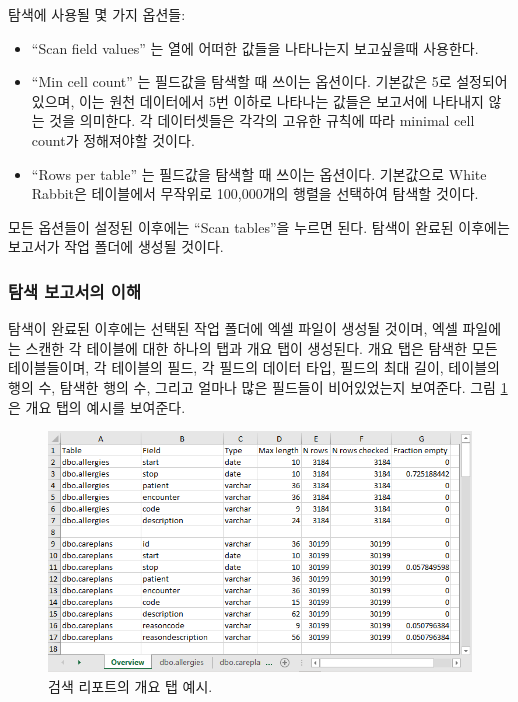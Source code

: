 \documentclass[11pt]{book}
\providecommand{\tightlist}{%
  \setlength{\itemsep}{0pt}\setlength{\parskip}{0pt}}
\theoremstyle{definition}
\theoremstyle{definition}
\theoremstyle{definition}
\theoremstyle{remark}
\begin{document}
탐색에 사용될 몇 가지 옵션들:

\begin{itemize}
\tightlist
\item
  ``Scan field values'' 는 열에 어떠한 값들을 나타나는지 보고싶을때
  사용한다.
\item
  ``Min cell count'' 는 필드값을 탐색할 때 쓰이는 옵션이다. 기본값은 5로
  설정되어 있으며, 이는 원천 데이터에서 5번 이하로 나타나는 값들은
  보고서에 나타내지 않는 것을 의미한다. 각 데이터셋들은 각각의 고유한
  규칙에 따라 minimal cell count가 정해져야할 것이다.
\item
  ``Rows per table'' 는 필드값을 탐색할 때 쓰이는 옵션이다. 기본값으로
  White Rabbit은 테이블에서 무작위로 100,000개의 행렬을 선택하여 탐색할
  것이다.
\end{itemize}

모든 옵션들이 설정된 이후에는 ``Scan tables''을 누르면 된다. 탐색이
완료된 이후에는 보고서가 작업 폴더에 생성될 것이다.

\subsubsection*{탐색 보고서의 이해}\label{--}

탐색이 완료된 이후에는 선택된 작업 폴더에 엑셀 파일이 생성될 것이며,
엑셀 파일에는 스캔한 각 테이블에 대한 하나의 탭과 개요 탭이 생성된다.
개요 탭은 탐색한 모든 테이블들이며, 각 테이블의 필드, 각 필드의 데이터
타입, 필드의 최대 길이, 테이블의 행의 수, 탐색한 행의 수, 그리고 얼마나
많은 필드들이 비어있었는지 보여준다. 그림 \ref{fig:ScanOverviewTab}은
개요 탭의 예시를 보여준다.

\begin{figure}

{\centering \includegraphics[width=1\linewidth]{images/ExtractTransformLoad/ScanOverviewTab} 

}

\caption{검색 리포트의 개요 탭 예시.}\label{fig:ScanOverviewTab}
\end{figure}
\end{document}
